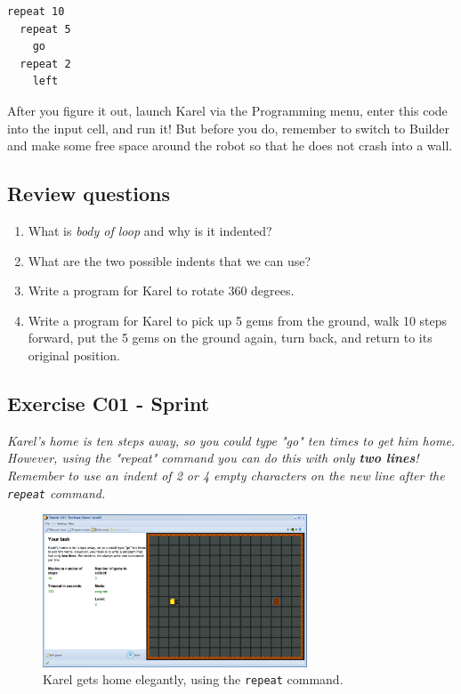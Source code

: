 \documentclass[article,A4,12pt]{llncs}
\begin{document}
\begin{verbatim}
repeat 10
  repeat 5
    go
  repeat 2
    left
\end{verbatim}
After you figure it out, launch Karel via the Programming menu, enter this code into
the input cell, and run it! But before you do, remember to switch to Builder and make some free space around the robot 
so that he does not crash into a wall.

\subsection{Review questions} 

\begin{enumerate}
\item What is {\em body of loop} and why is it indented?
\item What are the two possible indents that we can use?
\item Write a program for Karel to rotate 360 degrees.
\item Write a program for Karel to pick up 5 gems from the ground, walk 10 steps forward, put the 5 gems 
      on the ground again, turn back, and return to its original position. 
\end{enumerate}

\subsection{Exercise C01 - Sprint}

{\em Karel's home is ten steps away, so you could type "go" ten times to get him home. However, using the "repeat" command you can do this with only {\bf two lines}! Remember to use an indent of 2 or 4 empty characters on the new line after the {\tt repeat} command.}

\begin{figure}[!ht]
\begin{center}
\includegraphics[width=0.7\textwidth]{img/c01.png}
\end{center}
\vspace{-4mm}
\caption{Karel gets home elegantly, using the {\tt repeat} command.}
\label{fig:c01}
\vspace{-4mm}
\end{figure}
\noindent
\end{document}
